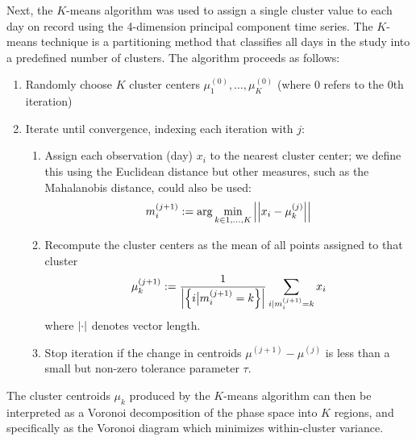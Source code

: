 \documentclass[twocol]{ametsoc}
\begin{document}
Next, the $K$-means algorithm was used to assign a single cluster value to each day on record using the 4-dimension principal component time series.
The $K$-means technique is a partitioning method that classifies all days in the study into a predefined number of clusters.
The algorithm proceeds as follows:
\begin{enumerate}
	\item Randomly choose $K$ cluster centers $\mu_1^{(0)}, \ldots, \mu_K^{(0)}$ (where $0$ refers to the $0$th iteration)
	\item Iterate until convergence, indexing each iteration with $j$:
	\begin{enumerate}
		\item Assign each observation (day) $x_i$ to the nearest cluster center; we define this using the Euclidean distance but other measures, such as the Mahalanobis distance, could also be used:
		\begin{equation}
			m_i^{(j+1)} := \arg\min_{k\in 1,\ldots,K} \abs{\abs{x_i - \mu_k^{(j)}}}
		\end{equation}
		\item Recompute the cluster centers as the mean of all points assigned to that cluster
		\begin{equation}
			\mu_k^{(j+1)} := \frac{1}{\abs{\qty{i \big| m_i^{(j+1)}=k}}} \sum_{i | m_i^{(j+1)}=k} x_i
		\end{equation}
		where $\abs{\cdot}$ denotes vector length.
		\item Stop iteration if the change in centroids $\mu^{(j+1)} - \mu^{(j)}$ is less than a small but non-zero tolerance parameter $\tau$.
	\end{enumerate}
\end{enumerate}
The cluster centroids $\mu_k$ produced by the $K$-means algorithm can then be interpreted as a Voronoi decomposition of the phase space into $K$ regions, and specifically as the Voronoi diagram which minimizes within-cluster variance.
\end{document}
